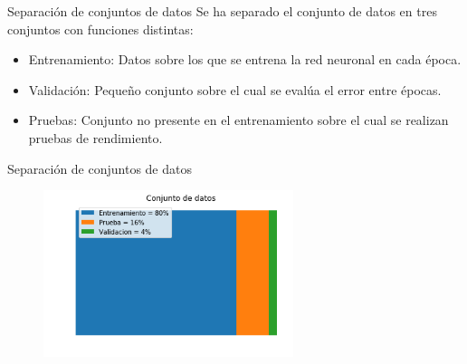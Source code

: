 \documentclass[10pt]{beamer}
\begin{document}
\begin{frame}{Separación de conjuntos de datos}
    Se ha separado el conjunto de datos en tres conjuntos con funciones distintas:
    \begin{itemize}
        \item \alert{Entrenamiento}: Datos sobre los que se entrena la red neuronal en cada época.
        \item \alert{Validación}: Pequeño conjunto sobre el cual se evalúa el error entre épocas.
        \item \alert{Pruebas}: Conjunto no presente en el entrenamiento sobre el cual se realizan pruebas de rendimiento.
    \end{itemize}
\end{frame}

\begin{frame}{Separación de conjuntos de datos}
    \begin{table}[!h]
        \centering
    \end{table}
    \begin{figure}[!h] 
        \centering
        \includegraphics[width=0.65\textwidth]{../img/dataset1}
    \end{figure}
\end{frame}
\end{document}
